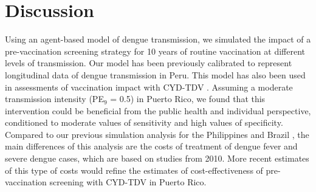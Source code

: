 \documentclass[11pt]{article}
\begin{document}
\section{Discussion}
\label{sec:org6db2042}
Using an agent-based model of dengue transmission, we simulated the impact of a pre-vaccination screening strategy for 10 years of routine vaccination at different levels of transmission. Our model has been previously calibrated to represent longitudinal data of dengue transmission in Peru. This model has also been used in assessments of vaccination impact with CYD-TDV \cite{flasche2016}. Assuming a moderate transmission intensity (PE\(_{\text{9}}\) = 0.5) in Puerto Rico, we found that this intervention could be beneficial from the public health and individual perspective, conditioned to moderate values of sensitivity and high values of specificity. Compared to our previous simulation analysis for the Philippines and Brazil \cite{Espana2019Biorxiv}, the main differences of this analysis are the costs of treatment of dengue fever and severe dengue cases, which are based on studies from 2010. More recent estimates of this type of costs would refine the estimates of cost-effectiveness of pre-vaccination screening with CYD-TDV in Puerto Rico. 



\end{document}
